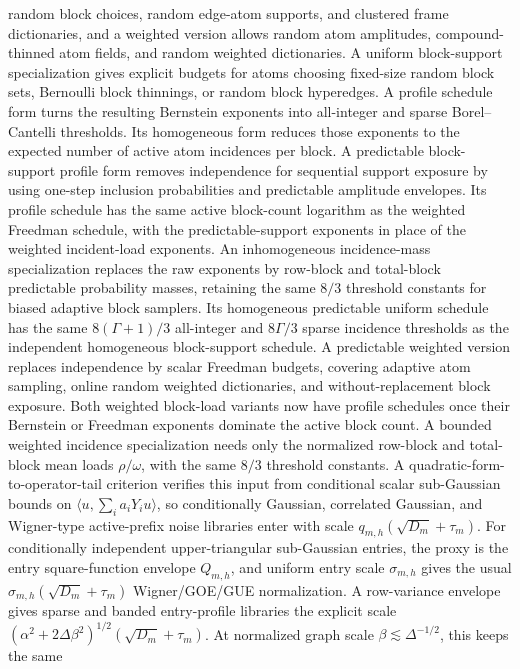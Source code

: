 \documentclass[11pt]{article}
\begin{document}
random block choices, random edge-atom supports, and clustered frame
dictionaries, and a weighted version allows random atom amplitudes,
compound-thinned atom fields, and random weighted dictionaries.
A uniform block-support specialization gives explicit budgets for atoms choosing
fixed-size random block sets, Bernoulli block thinnings, or random block
hyperedges.
A profile schedule form turns the resulting Bernstein exponents into
all-integer and sparse Borel--Cantelli thresholds.
Its homogeneous form reduces those exponents to the expected number of active
atom incidences per block.
A predictable block-support profile form removes independence for sequential
support exposure by using one-step inclusion probabilities and predictable
amplitude envelopes.
Its profile schedule has the same active block-count logarithm as the weighted
Freedman schedule, with the predictable-support exponents in place of the
weighted incident-load exponents.
An inhomogeneous incidence-mass specialization replaces the raw exponents by
row-block and total-block predictable probability masses, retaining the same
\(8/3\) threshold constants for biased adaptive block samplers.
Its homogeneous predictable uniform schedule has the same
\(8(\Gamma+1)/3\) all-integer and \(8\Gamma/3\) sparse incidence thresholds as
the independent homogeneous block-support schedule.
A predictable weighted version replaces independence by scalar Freedman budgets,
covering adaptive atom sampling, online random weighted dictionaries, and
without-replacement block exposure.
Both weighted block-load variants now have profile schedules once their
Bernstein or Freedman exponents dominate the active block count.
A bounded weighted incidence specialization needs only the normalized
row-block and total-block mean loads \(\rho/\omega\), with the same \(8/3\)
threshold constants.
A quadratic-form-to-operator-tail criterion verifies this input from conditional
scalar sub-Gaussian bounds on \(\langle u,\sum_i a_iY_i u\rangle\), so
conditionally Gaussian, correlated Gaussian, and Wigner-type active-prefix noise
libraries enter with scale \(q_{m,h}(\sqrt{D_m}+\tau_m)\).
For conditionally independent upper-triangular sub-Gaussian entries, the proxy is
the entry square-function envelope \(Q_{m,h}\), and uniform entry scale
\(\sigma_{m,h}\) gives the usual
\(\sigma_{m,h}(\sqrt{D_m}+\tau_m)\) Wigner/GOE/GUE normalization.
A row-variance envelope gives sparse and banded entry-profile libraries the
explicit scale
\((\alpha^2+2\Delta\beta^2)^{1/2}(\sqrt{D_m}+\tau_m)\).
At normalized graph scale \(\beta\lesssim\Delta^{-1/2}\), this keeps the same
\end{document}
